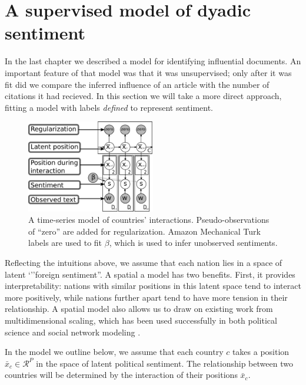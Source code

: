 \section{A supervised model of dyadic sentiment}
\label{section:foreign_relations_supervised_model}

In the last chapter we described a model for identifying influential
documents.  An important feature of that model was that it was
unsupervised; only after it was fit did we compare the inferred
influence of an article with the number of citations it had recieved.
In this section we will take a more direct approach, fitting a
model with labels \emph{defined} to represent sentiment.

\begin{figure}
  \center
  \vspace{-55pt}
  \includegraphics[width=0.5\textwidth]{chapter_foreign_relations/figures/countries_gm.pdf}
  \caption{A time-series model of countries' interactions.
    Pseudo-observations of ``zero'' are added for regularization.
    Amazon Mechanical Turk labels are used to fit $\beta$, which is
    used to infer unobserved sentiments.}
  \label{figure:gm}
\end{figure}
Reflecting the intuitions above, we assume that each nation lies in a
space of latent `''foreign sentiment''.  A spatial a model has two
benefits. First, it provides interpretability: nations with similar
positions in this latent space tend to interact more positively, while
nations further apart tend to have more tension in their relationship.
A spatial model also allows us to draw on existing work from
multidimensional scaling, which has been used successfully in both
political science \cite{martin:2002,jackman:2001} and social network
modeling \cite{hoff:2002,chang:2009}.

In the model we outline below, we assume that each country $c$ takes a
position $\bar x_c \in \mathcal{R}^P$ in the space of latent political
sentiment. The relationship between two countries will be determined
by the interaction of their positions $\bar x_c$.

